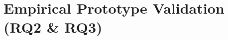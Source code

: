 \chapter{Empirical Prototype Validation (RQ2 \& RQ3)}
\label{ch:empirical-prototype-validation}




